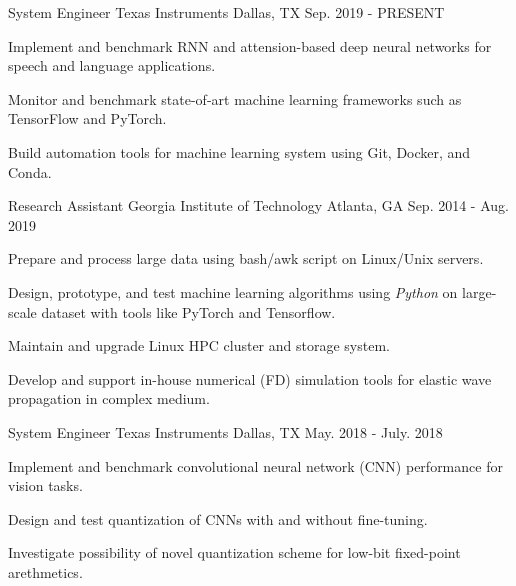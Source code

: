 

\begin{cventries}

\cventry
{System Engineer} %
{Texas Instruments} %
{Dallas, TX} %
{Sep. 2019 - PRESENT} %
{
    \begin{cvitems} %
        \item {Implement and benchmark RNN and attension-based deep neural networks for speech and language applications.}
        \item {Monitor and benchmark state-of-art machine learning frameworks such as TensorFlow and PyTorch.}
        \item {Build automation tools for machine learning system using Git, Docker, and Conda.}
    \end{cvitems}
}

  \cventry
    {Research Assistant} %
    {Georgia Institute of Technology} %
    {Atlanta, GA} %
    {Sep. 2014 - Aug. 2019} %
    {
      \begin{cvitems} %
        \item {Prepare and process large data using bash/awk script on Linux/Unix servers.}
        \item {Design, prototype, and test machine learning algorithms using \textit{Python} on large-scale dataset with tools like PyTorch and Tensorflow.}
        \item {Maintain and upgrade Linux HPC cluster and storage system.}
        \item {Develop and support in-house numerical (FD) simulation tools for elastic wave propagation in complex medium.}
      \end{cvitems}
    }

\cventry
{System Engineer} %
{Texas Instruments} %
{Dallas, TX} %
{May. 2018 - July. 2018} %
{
    \begin{cvitems} %
        \item {Implement and benchmark convolutional neural network (CNN) performance for vision tasks.}
        \item {Design and test quantization of CNNs with and without fine-tuning.}
        \item {Investigate possibility of novel quantization scheme for low-bit fixed-point arethmetics.}
    \end{cvitems}
}


\end{cventries}
